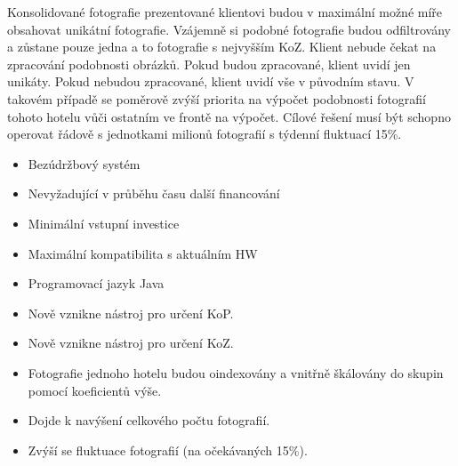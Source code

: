 Konsolidované fotografie prezentované klientovi budou v maximální možné míře obsahovat unikátní fotografie. Vzájemně si podobné fotografie budou odfiltrovány a zůstane pouze jedna a to fotografie s nejvyšším KoZ. Klient nebude čekat na zpracování podobnosti obrázků. Pokud budou zpracované, klient uvidí jen unikáty. Pokud nebudou zpracované, klient uvidí vše v původním stavu. V takovém případě se poměrově zvýší priorita na výpočet podobnosti fotografií tohoto hotelu vůči ostatním ve frontě na výpočet. Cílové řešení musí být schopno operovat řádově s jednotkami milionů fotografií s týdenní fluktuací 15\%.

\begin{itemize}
	\setlength{\parskip}{0pt}
	\setlength{\itemsep}{0pt}
	\item {Bezúdržbový systém}
	\item {Nevyžadující v průběhu času další financování}
	\item {Minimální vstupní investice}
	\item {Maximální kompatibilita s aktuálním HW}
	\item {Programovací jazyk Java~\cite{java}}
\end{itemize}

\begin{itemize}
	\setlength{\parskip}{0pt}
	\setlength{\itemsep}{0pt}
	\item {Nově vznikne nástroj pro určení KoP.}
	\item {Nově vznikne nástroj pro určení KoZ.}
	\item {Fotografie jednoho hotelu budou oindexovány a vnitřně škálovány do skupin pomocí koeficientů výše.}
	\item {Dojde k navýšení celkového počtu fotografií.}
	\item {Zvýší se fluktuace fotografií (na očekávaných 15\%).}
\end{itemize}

